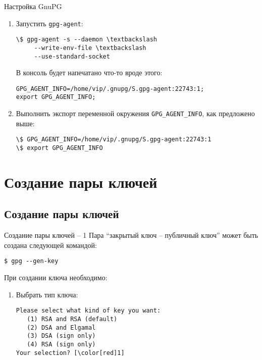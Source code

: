 \documentclass[presentation]{beamer}
\begin{document}
\begin{frame}[fragile]{Настройка GnuPG}
  \begin{enumerate}
  \item Запустить \texttt{gpg-agent}:
\begin{Verbatim}[commandchars=\\\[\]]
\$ gpg-agent -s --daemon \textbackslash
     --write-env-file \textbackslash
     --use-standard-socket
\end{Verbatim}
\vspace{5 mm}
В консоль будет напечатано что-то вроде этого:
\begin{Verbatim}[commandchars=\\\[\]]
GPG_AGENT_INFO=/home/vip/.gnupg/S.gpg-agent:22743:1;
export GPG_AGENT_INFO;
\end{Verbatim}
\vspace{5 mm}
\item Выполнить экспорт переменной окружения \texttt{GPG\_AGENT\_INFO},
  как предложено выше:
\begin{Verbatim}[commandchars=\\\[\]]
\$ GPG_AGENT_INFO=/home/vip/.gnupg/S.gpg-agent:22743:1
\$ export GPG_AGENT_INFO
\end{Verbatim}
  \end{enumerate}
\end{frame}


\section{Создание пары ключей}

\subsection{Создание пары ключей}

\begin{frame}[fragile]{Создание пары ключей -- 1}
  Пара ``закрытый ключ -- публичный ключ'' может быть создана
  следующей командой:
\begin{verbatim}
$ gpg --gen-key
\end{verbatim}
  При создании ключа необходимо:
  \begin{enumerate}
  \item Выбрать тип ключа:
\begin{Verbatim}[commandchars=\\\[\]]
Please select what kind of key you want:
   (1) RSA and RSA (default)
   (2) DSA and Elgamal
   (3) DSA (sign only)
   (4) RSA (sign only)
Your selection? [\color[red]1]
\end{Verbatim}
    \end{enumerate}
\end{frame}
\end{document}
